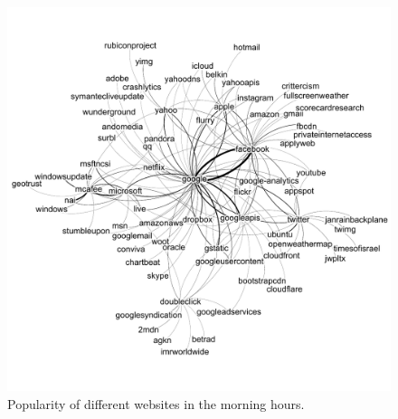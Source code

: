 \documentclass[letterpaper,twocolumn]{article}
\begin{document}
 
\begin{figure}[t]
\centering
{}
\vspace{-35pt}
\includegraphics[width=\linewidth]{img/MorningLength2Cluster}
\vspace{-50pt}
\caption{Popularity of different websites in the morning hours.}
 \label{fig:morning}
\endminipage
    \vspace{-15pt}
 \end{figure}
\end{document}
